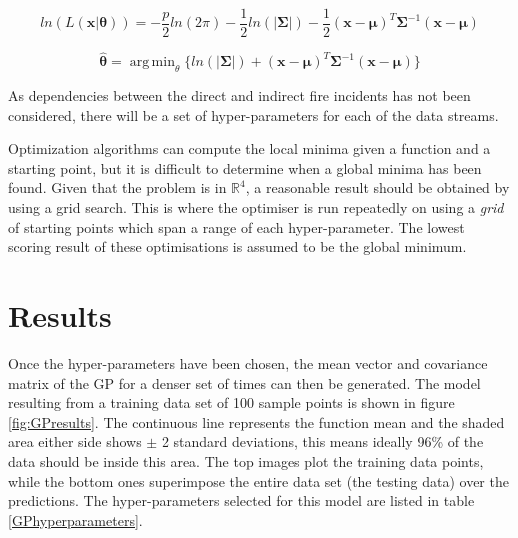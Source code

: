 \documentclass[a4paper,11pt]{report}
\DeclareMathOperator*{\argmin}{arg\,min}
\begin{document}
\singlespacing

\begin{equation} \label{eq:GPloglikelihood}
ln(L(\mathbf{x} | \boldsymbol{\theta})) = - \frac{p}{2} ln(2\pi) - \frac{1}{2} ln(|\boldsymbol{\Sigma}|) - \frac{1}{2} (\mathbf{x}-\boldsymbol{\mu})^{T} \boldsymbol{\Sigma}^{-1}(\mathbf{x}-\boldsymbol{\mu})
\end{equation}

\begin{equation} \label{eq:GPfmin}
\hat{\boldsymbol{\theta}} = \argmin_\theta{\{ln(|\boldsymbol{\Sigma}|) +(\mathbf{x}-\boldsymbol{\mu})^{T}\boldsymbol{\Sigma}^{-1}(\mathbf{x}-\boldsymbol{\mu})}\}
\end{equation}

\doublespacing

As dependencies between the direct and indirect fire incidents has not been considered, there will be a set of hyper-parameters for each of the data streams. \par

Optimization algorithms can compute the local minima given a function and a starting point, but it is difficult to determine when a global minima has been found. Given that the problem is in \(\mathds{R}^4\), a reasonable result should be obtained by using a grid search. This is where the optimiser is run repeatedly on using a \textit{grid} of starting points which span a range of each hyper-parameter. The lowest scoring result of these optimisations is assumed to be the global minimum. \par

\section{Results}

Once the hyper-parameters have been chosen, the mean vector and covariance matrix of the GP for a denser set of times can then be generated. The model resulting from a training data set of 100 sample points is shown in figure \ref{fig:GPresults}. The continuous line represents the function mean and the shaded area either side shows \(\pm\) 2 standard deviations, this means ideally 96\% of the data should be inside this area. The top images plot the training data points, while the bottom ones superimpose the entire data set (the testing data) over the predictions. The hyper-parameters selected for this model are listed in table \ref{GPhyperparameters}.
\end{document}
